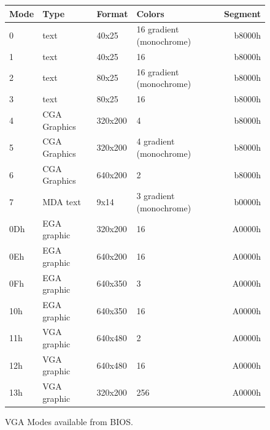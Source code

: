 \documentclass[book.tex]{subfiles}
\begin{document}
\begin{figure}[H]
\centering
\begin{table}[H]
\begin{tabularx}{\textwidth}[c]{llllr}
\hline
\textbf{Mode} & \textbf{Type} & \textbf{Format} & \textbf{Colors}          & \multicolumn{1}{l}{\textbf{Segment}} \\ \hline
0             & text          & 40x25           & 16 gradient (monochrome) & b8000h                                \\ \hline
1             & text          & 40x25           & 16                       & b8000h                                \\ \hline
2             & text          & 80x25           & 16 gradient (monochrome) & b8000h                                \\ \hline
3             & text          & 80x25           & 16                       & b8000h                                \\ \hline
4             & CGA Graphics  & 320x200         & 4                        & b8000h                                \\ \hline
5             & CGA Graphics  & 320x200         & 4 gradient (monochrome)  & b8000h                                \\ \hline
6             & CGA Graphics  & 640x200         & 2                        & b8000h                                \\ \hline
7             & MDA text      & 9x14            & 3 gradient (monochrome)  & b0000h                                \\ \hline
0Dh           & EGA graphic   & 320x200         & 16                       & A0000h                                \\ \hline
0Eh           & EGA graphic   & 640x200         & 16                       & A0000h                                \\ \hline
0Fh           & EGA graphic   & 640x350         & 3                        & A0000h                                \\ \hline
10h           & EGA graphic   & 640x350         & 16                       & A0000h                                \\ \hline
11h           & VGA graphic   & 640x480         & 2                        & A0000h                                \\ \hline
12h           & VGA graphic   & 640x480         & 16                       & A0000h                                \\ \hline
13h           & VGA graphic   & 320x200         & 256                      & A0000h                                \\ \hline
\end{tabularx}
\end{table}
\caption{VGA Modes available from BIOS.}\label{fig:vga_modes}
 \end{figure}
 
\end{document}
